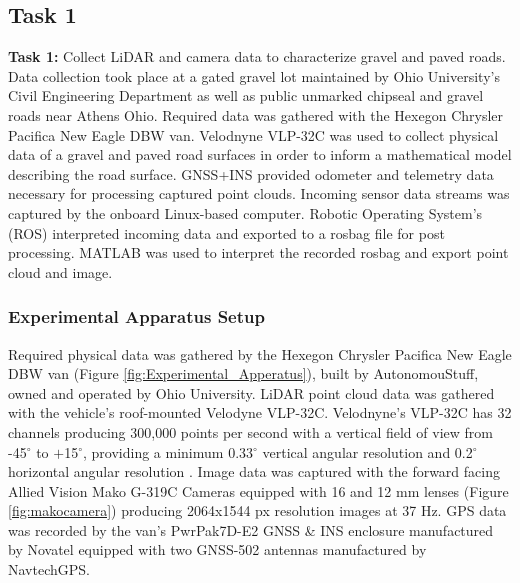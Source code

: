 \documentclass[numbered,pdftex]{ohio-etd}
\begin{document}
{{		\subsection{Task 1}{
	
			\textbf{Task 1: }{Collect LiDAR and camera data to characterize gravel and paved roads. Data collection took place at a gated gravel lot maintained by Ohio University's Civil Engineering Department as well as public unmarked chipseal and gravel roads near Athens Ohio. Required data was gathered with the Hexegon Chrysler Pacifica New Eagle DBW van. Velodnyne VLP-32C was used to collect physical data of a gravel and paved road surfaces in order to inform a mathematical model describing the road surface. GNSS+INS provided odometer and telemetry data necessary for processing captured point clouds. Incoming sensor data streams was captured by the onboard Linux-based computer. Robotic Operating System's (ROS) interpreted incoming data and exported to a rosbag file for post processing. MATLAB was used to interpret the recorded rosbag and export point cloud and image. }
	
			\subsubsection{Experimental Apparatus Setup}\label{sec:experimental-apparatus-setup}{
				
				{Required physical data was gathered by the Hexegon Chrysler Pacifica New Eagle DBW van (Figure \ref{fig:Experimental_Apperatus}), built by AutonomouStuff, owned and operated by Ohio University. LiDAR point cloud data was gathered with the vehicle's roof-mounted Velodyne VLP-32C. Velodnyne's VLP-32C has 32 channels producing 300,000 points per second with a vertical field of view from -45$^{\circ}$ to $+$15$^{\circ}$, providing a minimum 0.33$^{\circ}$ vertical angular resolution and 0.2$^{\circ}$ horizontal angular resolution \cite{vlp_32c}. Image data was captured with the forward facing Allied Vision Mako G-319C Cameras equipped with 16 and 12 mm lenses (Figure \ref{fig:makocamera}) producing 2064x1544 px resolution images at 37 Hz. GPS data was recorded by the van's PwrPak7D-E2 GNSS \& INS enclosure manufactured by Novatel equipped with two GNSS-502 antennas manufactured by NavtechGPS.}
				
}}}}
\end{document}
